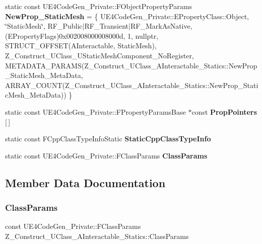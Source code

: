 \begin{DoxyCompactItemize}
static const U\+E4\+Code\+Gen\+\_\+\+Private\+::\+F\+Object\+Property\+Params {\bfseries New\+Prop\+\_\+\+Static\+Mesh} = \{ U\+E4\+Code\+Gen\+\_\+\+Private\+::\+E\+Property\+Class\+::\+Object, \char`\"{}Static\+Mesh\char`\"{}, R\+F\+\_\+\+Public$\vert$R\+F\+\_\+\+Transient$\vert$R\+F\+\_\+\+Mark\+As\+Native, (E\+Property\+Flags)0x002008000008000d, 1, nullptr, S\+T\+R\+U\+C\+T\+\_\+\+O\+F\+F\+S\+E\+T(\+A\+Interactable, Static\+Mesh), Z\+\_\+\+Construct\+\_\+\+U\+Class\+\_\+\+U\+Static\+Mesh\+Component\+\_\+\+No\+Register, M\+E\+T\+A\+D\+A\+T\+A\+\_\+\+P\+A\+R\+A\+M\+S(\+Z\+\_\+\+Construct\+\_\+\+U\+Class\+\_\+\+A\+Interactable\+\_\+\+Statics\+::\+New\+Prop\+\_\+\+Static\+Mesh\+\_\+\+Meta\+Data, A\+R\+R\+A\+Y\+\_\+\+C\+O\+U\+N\+T(\+Z\+\_\+\+Construct\+\_\+\+U\+Class\+\_\+\+A\+Interactable\+\_\+\+Statics\+::\+New\+Prop\+\_\+\+Static\+Mesh\+\_\+\+Meta\+Data)) \}
\item 
static const U\+E4\+Code\+Gen\+\_\+\+Private\+::\+F\+Property\+Params\+Base $\ast$const {\bfseries Prop\+Pointers} \mbox{[}$\,$\mbox{]}
\item 
static const F\+Cpp\+Class\+Type\+Info\+Static {\bfseries Static\+Cpp\+Class\+Type\+Info}
\item 
static const U\+E4\+Code\+Gen\+\_\+\+Private\+::\+F\+Class\+Params {\bfseries Class\+Params}
\end{DoxyCompactItemize}


\subsection{Member Data Documentation}
\mbox{\label{struct_z___construct___u_class___a_interactable___statics_a752637447574d8d8963572d891be432b}} 
\subsubsection{\texorpdfstring{ClassParams}{ClassParams}}
{\footnotesize\ttfamily const U\+E4\+Code\+Gen\+\_\+\+Private\+::\+F\+Class\+Params Z\+\_\+\+Construct\+\_\+\+U\+Class\+\_\+\+A\+Interactable\+\_\+\+Statics\+::\+Class\+Params\hspace{0.3cm}{\ttfamily [static]}}

